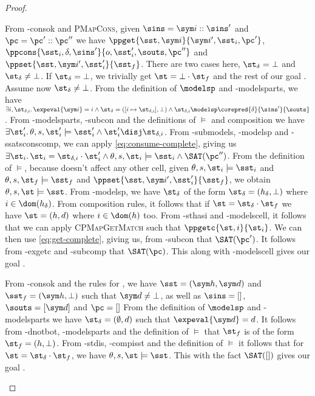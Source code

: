 \begin{proof}
\begin{hypvlist}
 From \hyp{consok} and \textsc{PMapCons}, given $\sins=\sym i::\sins'$ and $\pc=\pc'::\pc''$ we have $\ppget{\sst,\sym i}{\sym i', \sst_i, \pc'}$, ${\ppcons{\sst_i,\delta,\sins'}{o,\sst_i',\souts,\pc''}}$ and $\ppset{\sst,\sym i',\sst_i'}{\sst_f}$.
 There are two cases here, $\st_\delta=\bot$ and $\st_\delta\neq\bot$. If $\st_\delta=\bot$, we trivially get $\st=\bot\cdot\st_f$ and the rest of our goal .
 Assume now $\st_\delta\neq\bot$. From the definition of $\modelsp$ and \hyp{modelsparts}, we have $\exists i, \st_{\delta,i}\ldotp {\expeval{\sym i}=i} \land {\st_\delta=([i\mapsto\st_{\delta,i}],\bot)} \land \st_{\delta,i}\modelsp \corepred{\delta}{\sins'}{\souts}$.
 From \hyp{modelsparts}, \hyp{subcon} and the definitions of $\models$  and composition we have $\exists \st_i'\ldotp {\theta,s,\st_i'\models\sst_i'} \land \st_i' \disj \st_{\delta,i}$.
 From \hyp{submodels}, \hyp{modelsp} and \hyp{ssatsconscomp}, we can apply \ref{eq:consume-complete}, giving us $\exists \st_i\ldotp {\st_i=\st_{\delta,i}\cdot\st_i'} \land \theta,s,\st_i\models \sst_i \land \SAT(\pc'')$.
 From the definition of $\models$, because \consume{} doesn't affect any other cell, given ${\theta,s,\st_i\models\sst_i}$ and $\theta,s,\st_f\models\sst_f$ and $\ppset{\sst,\sym i',\sst_i'}{\sst_f}$, we obtain $\theta,s,\st\models\sst$.
 From \hyp{modelsp}, we have $\st_\delta$ of the form $\st_\delta=(h_\delta,\bot)$ where $i\in \dom(h_\delta)$. From composition rules, it follows that if $\st=\st_\delta\cdot\st_f$ we have $\st=(h,d)$ where $i\in \dom(h)$ too.
 From \hyp{sthasi} and \hyp{modelscell}, it follows that we can apply \textsc{CPMapGetMatch} such that ${\ppgetc{\st,i}{\st_i}}$. We can then use \ref{eq:get-complete}, giving us, from \hyp{subcon} that $\SAT(\pc')$.
 It follows from \hyp{exgetc} and \hyp{subcomp} that $\SAT(\pc)$. This along with \hyp{modelscell} gives our goal .
\end{hypvlist}

\pfcase{$\delta = \domainset$}

\begin{hypvlist}
 From \hyp{consok} and the rules for \consume{}, we have $\sst=(\sym h,\sym d)$ and $\sst_f=(\sym h,\bot)$ such that $\sym d\neq\bot$, as well as $\sins=[]$, $\souts=[\sym d]$ and $\pc=[]$
 From the definition of $\modelsp$ and \hyp{modelsparts} we have $\st_\delta=(\emptyset, d)$ such that $\expeval{\sym d}=d$.
 It follows from \hyp{dnotbot}, \hyp{modelsparts} and the definition of $\models$ that $\st_f$ is of the form $\st_f=(h, \bot)$.
 From \hyp{stdis}, \hyp{compisst} and the definition of $\models$ it follows that for $\st=\st_\delta\cdot\st_f$, we have $\theta,s,\st\models\sst$. This with the fact $\SAT([])$ gives our goal .
\end{hypvlist}


\end{proof}
